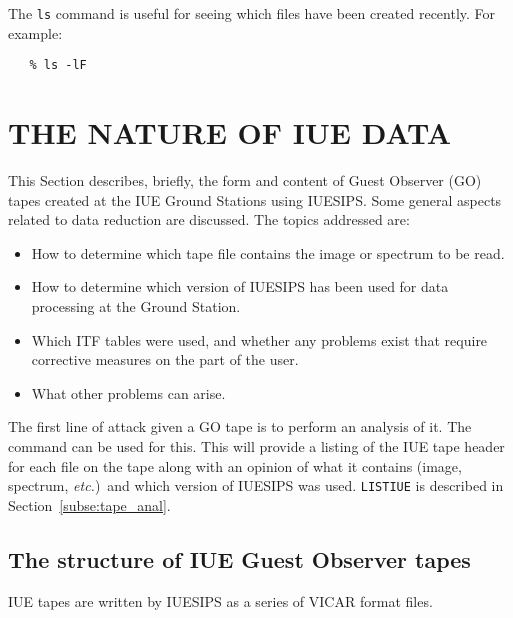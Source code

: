 The \verb+ls+ command is useful for seeing which files have been created
recently.
For example:

\begin{verbatim}
   % ls -lF
\end{verbatim}


\section{\label{se:nature}THE NATURE OF IUE DATA}

This Section describes, briefly, the form and content of Guest Observer
(GO) tapes created at the IUE Ground Stations using IUESIPS\@.
Some general aspects related to data reduction are discussed.
The topics addressed are:

\begin{itemize}

\item How to determine which tape file contains the image or spectrum to be
      read.

\item How to determine which version of IUESIPS has been used for data
      processing at the Ground Station.

\item Which ITF tables were used, and whether any problems exist that require
      corrective measures on the part of the user.

\item What other problems can arise.

\end{itemize}

The first line of attack given a GO tape is to perform an analysis of it.
The 
 command can be used for this.
This will provide a listing of the IUE tape header for each file on the tape
along with an opinion of what it contains (image, spectrum, {\it etc.})\ and 
which version of IUESIPS was used.
\verb+LISTIUE+ is described in Section~\ref{subse:tape_anal}\@.


\subsection{The structure of IUE Guest Observer tapes}

IUE tapes are written by IUESIPS as a series of VICAR format files.


